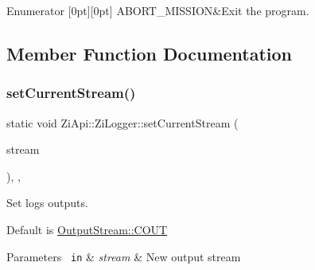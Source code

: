 \begin{DoxyEnumFields}{Enumerator}
[0pt][0pt]{}\mbox{\label{classZiApi_1_1ZiLogger_a2344ef7fcc5f37cac04a3efc8f993424a94668888264efde6cbdf61c98181438a}} 
A\+B\+O\+R\+T\+\_\+\+M\+I\+S\+S\+I\+ON&Exit the program. \\
\hline

\end{DoxyEnumFields}


\subsection{Member Function Documentation}
\mbox{\label{classZiApi_1_1ZiLogger_a210348e6fe7c30a1f52a2bd9414b0f66}} 
\subsubsection{\texorpdfstring{setCurrentStream()}{setCurrentStream()}}
{\footnotesize\ttfamily static void Zi\+Api\+::\+Zi\+Logger\+::set\+Current\+Stream (\begin{DoxyParamCaption}\item[{\mbox{\hyperlink{classZiApi_1_1ZiLogger_a0c544845c83a82d59454407e154634c2}{Output\+Stream}}}]{stream }\end{DoxyParamCaption})\hspace{0.3cm}{\ttfamily [inline]}, {\ttfamily [static]}, {\ttfamily [noexcept]}}



Set logs outputs. 

Default is \mbox{\hyperlink{classZiApi_1_1ZiLogger_a0c544845c83a82d59454407e154634c2a5822f620df7e1c3829eabe17ea69afbf}{Output\+Stream\+::\+C\+O\+UT}} 
\begin{DoxyParams}[1]{Parameters}
\mbox{\texttt{ in}}  & {\em stream} & New output stream \\
\hline
\end{DoxyParams}
\mbox{\label{classZiApi_1_1ZiLogger_a218a9e2df01c0984b4f9721e977dbb75}} 
